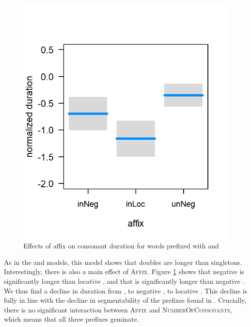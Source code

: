 \begin{figure} [b!]
	\vspace*{-0.5cm}
	\centering
	\includegraphics[scale=0.8] {images/Corpus/unInModel.png}
	\caption{Effects of  affix on consonant duration for words prefixed with  and }
	\label{fig:inUnModel}
\end{figure}



As in the  and models, this model shows that doubles are longer than singletons. Interestingly, there is also  a  main effect of \textsc{Affix}. Figure \ref{fig:inUnModel} shows that negative  is significantly longer than locative , and that  is significantly longer than negative .  We thus find a decline in duration from , to negative , to locative . This decline is fully in line with the decline in segmentability of the prefixes found in . Crucially, there is no significant interaction between \textsc{Affix} and \textsc{NumberOfConsonants}, which means that all three prefixes geminate.

